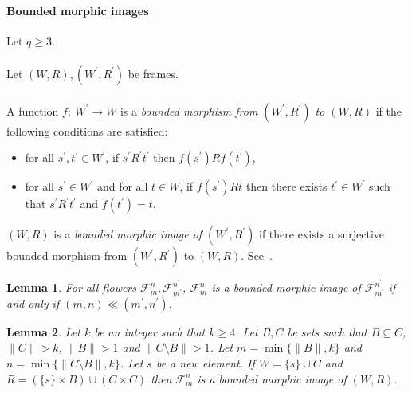 \documentclass[draft]{article}
\newtheorem{lemma}{Lemma}
\begin{document}
\paragraph{Bounded morphic images}
%
%
Let $q{\geq}3$.
%
%
\\
\\
%
%
Let $(W,R),(W^{\prime},R^{\prime})$ be frames.
%
%
\\
\\
%
%
A function $f:\ W^{\prime}{\longrightarrow}W$ is a {\it bounded morphism from $(W^{\prime},R^{\prime})$ to $(W,R)$}\/ if the following conditions are satisfied:
%
%
\begin{itemize}
%
%
\item for all $s^{\prime},t^{\prime}{\in}W^{\prime}$, if $s^{\prime}{R^{\prime}}t^{\prime}$ then $f(s^{\prime}){R}f(t^{\prime})$,
%
%
\item for all $s^{\prime}{\in}W^{\prime}$ and for all $t{\in}W$, if $f(s^{\prime}){R}t$ then there exists $t^{\prime}{\in}W^{\prime}$ such that $s^{\prime}{R^{\prime}}t^{\prime}$ and $f(t^{\prime})=t$.
%
%
\end{itemize}
%
%
$(W,R)$ is a {\it bounded morphic image of $(W^{\prime},R^{\prime})$}\/ if there exists a surjective bounded morphism from $(W^{\prime},R^{\prime})$ to $(W,R)$.
See~\cite[Chapter~$3$]{Blackburn:deRijke:Venema:2001}.
%
%
%
%
%
%
%
%
%
%
%
%
%
%
%
%
\begin{lemma}\label{lemma:about:bounded:morphisms:in:the:situation:of F:m:n:frames}
%
%
For all flowers ${\mathcal F}_{m}^{n},{\mathcal F}_{m^{\prime}}^{n^{\prime}}$, ${\mathcal F}_{m}^{n}$ is a bounded morphic image of ${\mathcal F}_{m^{\prime}}^{n^{\prime}}$ if and only if $(m,n){\ll}(m^{\prime},n^{\prime})$.
%
%
\end{lemma}
%
%
\begin{lemma}\label{lemma:about:k:s:new:element:bmi:of:W:R}
%
%
Let $k$ be an integer such that $k{\geq}4$.
Let $B,C$ be sets such that $B{\subseteq}C$, ${\parallel}C{\parallel}{>}k$, ${\parallel}B{\parallel}{>}1$ and ${\parallel}C{\setminus}B{\parallel}{>}1$.
Let $m{=}\min\{{\parallel}B{\parallel},k\}$ and $n{=}\min\{{\parallel}C{\setminus}B{\parallel},k\}$.
Let $s$ be a new element.
If $W{=}\{s\}{\cup}C$ and $R{=}(\{s\}{\times}B){\cup}(C{\times}C)$ then ${\mathcal F}_{m}^{n}$ is a bounded morphic image of $(W,R)$.
%
%
\end{lemma}
\end{document}
